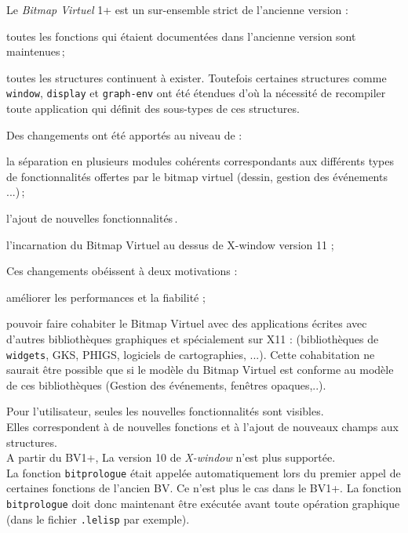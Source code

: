 Le {\em Bitmap Virtuel} 1+ est un sur-ensemble strict de l'ancienne version :
\begin {Itemize}
\item toutes les fonctions qui \'{e}taient document\'{e}es dans l'ancienne version
sont maintenues\,;
\item toutes les structures continuent \`{a} exister. Toutefois certaines
structures comme {\tt window}, {\tt display} et {\tt graph-env} ont \'{e}t\'{e}
\'{e}tendues d'o\`{u} la n\'{e}cessit\'{e} de recompiler 
toute application qui d\'{e}finit des sous-types de ces structures.
\end{Itemize}
Des changements ont \'{e}t\'{e} apport\'{e}s au niveau de :
\begin{Itemize}
\item la s\'{e}paration en plusieurs modules coh\'{e}rents correspondants
aux diff\'{e}rents types de fonctionnalit\'{e}s offertes par le bitmap virtuel
(dessin, gestion des \'{e}v\'{e}nements ...)\,;
\item l'ajout de nouvelles fonctionnalit\'{e}s\,.
\item l'incarnation du Bitmap Virtuel au dessus de X-window version 11 ;
\end{Itemize}
Ces changements ob\'{e}issent \`{a} deux motivations :
\begin {Itemize}
\item am\'{e}liorer les performances et la fiabilit\'{e} ;
\item pouvoir faire cohabiter le Bitmap Virtuel  avec des applications \'{e}crites
avec d'autres biblioth\`{e}ques graphiques et sp\'{e}cialement sur X11 : 
(biblioth\`{e}ques de {\tt widgets}, GKS, PHIGS, logiciels de cartographies, ...).
Cette cohabitation ne saurait \^{e}tre possible que si le mod\`{e}le du Bitmap
Virtuel est conforme au mod\`{e}le de ces biblioth\`{e}ques (Gestion des
\'{e}v\'{e}nements, fen\^{e}tres opaques,..).\\
\end{Itemize}






Pour l'utilisateur, seules les nouvelles fonctionnalit\'{e}s sont
visibles.\\
Elles correspondent \`{a} de nouvelles fonctions et \`{a} l'ajout
de nouveaux champs aux structures.\\
A partir du BV1+, La version 10 de {\em X-window} n'est plus support\'{e}e.\\
La fonction {\tt bitprologue} \'{e}tait appel\'{e}e automatiquement lors du premier
appel de certaines fonctions de l'ancien BV. Ce n'est plus le cas dans le
BV1+. La fonction {\tt bitprologue} doit donc maintenant \^{e}tre ex\'{e}cut\'{e}e
avant toute op\'{e}ration graphique (dans le fichier {\tt .lelisp} par exemple).


